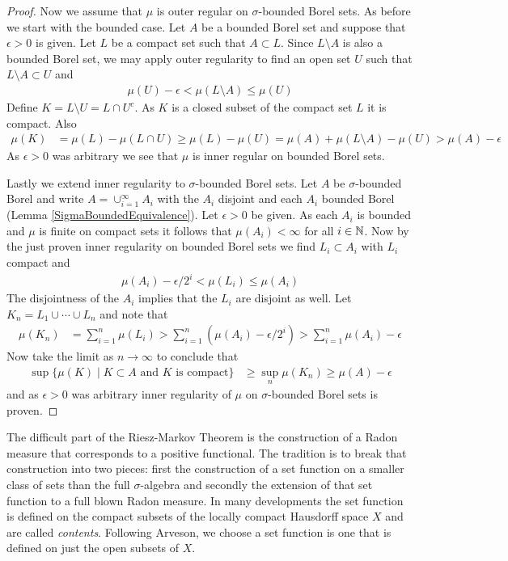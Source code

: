 \begin{proof}
Now we assume that $\mu$ is outer regular on $\sigma$-bounded Borel
sets.  As before we start with the bounded case.  Let $A$ be a bounded
Borel set and suppose that $\epsilon > 0$ is given.  Let $L$ be a
compact set such that $A \subset L$.  Since $L \setminus A$ is also a
bounded Borel set, we may apply outer regularity to find an open set
$U$ such that $L \setminus A \subset U$ and 
\begin{align*}
\mu(U) - \epsilon < \mu(L \setminus A) \leq \mu(U)
\end{align*}
Define $K = L \setminus U = L \cap U^c$. As $K$ is a closed subset of the compact set $L$
it is compact.  Also
\begin{align*}
\mu(K) &= \mu(L) - \mu(L \cap U) \geq \mu(L) - \mu(U) = \mu(A) + \mu(L
\setminus A) - \mu(U) > \mu(A) - \epsilon
\end{align*}
As $\epsilon >0$ was arbitrary we see that $\mu$ is inner regular on
bounded Borel sets.  

Lastly we extend inner regularity to
$\sigma$-bounded Borel sets.  Let $A$ be $\sigma$-bounded Borel and
write $A = \cup_{i=1}^\infty A_i$ with the $A_i$ disjoint and each
$A_i$ bounded Borel (Lemma \ref{SigmaBoundedEquivalence}).  Let
$\epsilon > 0$ be given.  As each
$A_i$ is bounded and $\mu$ is finite on compact sets it follows that
$\mu(A_i) < \infty$ for all $i \in \mathbb{N}$.  Now by the just proven
inner regularity on bounded Borel sets we find $L_i \subset A_i$ with
$L_i$ compact and
\begin{align*}
\mu(A_i) - \epsilon/2^i < \mu(L_i) \leq \mu(A_i)
\end{align*}
The disjointness of the $A_i$ implies that the $L_i$ are disjoint as well.
Let $K_n = L_1 \cup \dotsb \cup L_n$ and note that
\begin{align*}
\mu(K_n) &= \sum_{i=1}^n \mu(L_i) > \sum_{i=1}^n \left( \mu(A_i) -
\epsilon/2^i \right ) > \sum_{i=1}^n \mu(A_i) - \epsilon
\end{align*}
Now take the limit as $n \to \infty$ to conclude that 
\begin{align*}
\sup \lbrace \mu(K) \mid K \subset A \text{ and $K$ is compact}
\rbrace &\geq \sup_n \mu(K_n) \geq \mu(A) - \epsilon
\end{align*}
and as $\epsilon > 0$ was arbitrary inner regularity of $\mu$ on
$\sigma$-bounded Borel sets is proven.
\end{proof}

The difficult part of the Riesz-Markov Theorem is the construction of
a Radon measure that corresponds to a positive functional.  The
tradition is to break that construction into two pieces: first the
construction of a set function on a smaller class of sets than the
full $\sigma$-algebra  and secondly the extension of that set function
to a full blown Radon measure. In many developments the set function
is defined on the compact subsets of the  locally compact
Hausdorff space $X$ and are called \emph{contents}.  Following
Arveson, we choose a set function is one
that is defined on just the open subsets of $X$.


